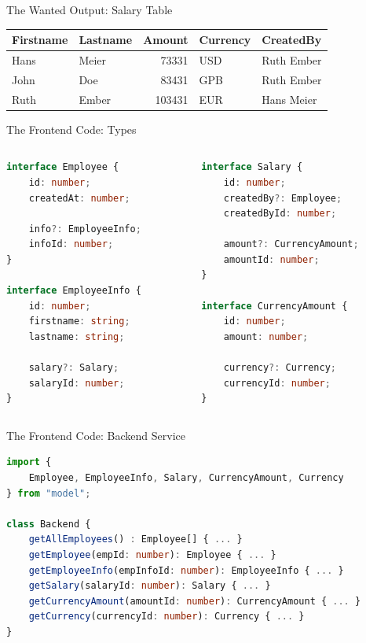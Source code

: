 \documentclass[aspectratio=169,notes]{beamer}
\begin{document}
	\begin{frame}[fragile]{The Wanted Output: Salary Table}
		\Large
		\begin{center}
		\begin{tabular}{l | l | r | l | l}
			Firstname & Lastname & Amount & Currency & CreatedBy \\ \hline
			Hans & Meier & 73331 & USD & Ruth Ember \\
			John & Doe & 83431 & GPB & Ruth Ember \\
			Ruth & Ember & 103431 & EUR & Hans Meier \\
		\end{tabular}	
		\end{center}
	\end{frame}

	\begin{frame}[fragile]{The Frontend Code: Types}
\begin{columns}
\begin{column}{0.5\textwidth}
\begin{lstlisting}[language=typescript,basicstyle=\small\ttfamily]
interface Employee {
	id: number;
	createdAt: number;

	info?: EmployeeInfo;
	infoId: number;
}	

interface EmployeeInfo {
	id: number;
	firstname: string;
	lastname: string;

	salary?: Salary;
	salaryId: number;
}	
\end{lstlisting}
\end{column}
\begin{column}{0.5\textwidth}
\begin{lstlisting}[language=TypeScript,basicstyle=\small\ttfamily,firstnumber=17]
interface Salary {
	id: number;
	createdBy?: Employee;
	createdById: number;

	amount?: CurrencyAmount;
	amountId: number;
}

interface CurrencyAmount {
	id: number;
	amount: number;

	currency?: Currency;
	currencyId: number;
}
\end{lstlisting}
\end{column}
\end{columns}
	\end{frame}

	\begin{frame}[fragile]{The Frontend Code: Backend Service}
\begin{lstlisting}[language=TypeScript,basicstyle=\small\ttfamily,tabsize=4]
import { 
	Employee, EmployeeInfo, Salary, CurrencyAmount, Currency 
} from "model";

class Backend {
	getAllEmployees() : Employee[] { ... }
	getEmployee(empId: number): Employee { ... }
	getEmployeeInfo(empInfoId: number): EmployeeInfo { ... }
	getSalary(salaryId: number): Salary { ... }
	getCurrencyAmount(amountId: number): CurrencyAmount { ... }
	getCurrency(currencyId: number): Currency { ... }
}
\end{lstlisting}
	\end{frame}
\end{document}
